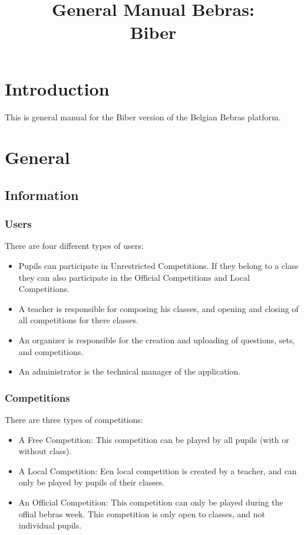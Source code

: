 \documentclass[11pt,a4paper]{report}
\title{General Manual Bebras:\\ Biber}
\begin{document}
\maketitle
\parindent 0pt
\tableofcontents

\chapter{Introduction}
This is general manual for the Biber version of the Belgian Bebras platform.
 

\chapter{General}

\section{Information}
\subsection{Users}
There are four different types of users:\begin{itemize}
\item Pupils can participate in Unrestricted Competitions. If they belong to a class they can also participate in the Official Competitions and Local Competitions.
\item A teacher is responsible for composing his classes, and opening and closing of all competitions for there classes.
\item An organizer is responsible for the creation and uploading of questions, sets, and competitions. 
\item An administrator is the technical manager of the application.
\end{itemize}

\subsection{Competitions}
There are three types of competitions:
\begin{itemize}
\item A Free Competition: This competition can be played by all pupils (with or without class).
\item A Local Competition: Een local competition is created by a teacher, and can only be played by pupils of their classes.
\item An Official Competition: This competition can only be played during the offial bebras week. This competition is only open to classes, and not individual pupils.
\end{itemize}
\end{document}
